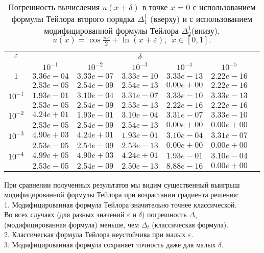 \documentclass[10pt,twoside]{uz_kgu}
\begin{document}
\begin{table} [!htb]
		\caption {Погрешность вычисления $u(x+ \delta)$ в точке $x=0$ с использованием формулы Тейлора второго порядка $\Delta_1^1$ (вверху) и с использованием модифицированной формулы Тейлора $\Delta_2^1$(внизу),
		$u(x)=  \cos \frac{\pi x}{2} + \ln{(x+\varepsilon)} ,\ \    x\in [0,1].$}
	\begin{center}
		\begin{tabular}{|c|c|c|c|c|c|c}
			\cline{1-6} $\varepsilon$ & \multicolumn{5}{c|}{$\delta$} \\
			\cline{2-6} &$10^{-1}$ & $10^{-2}$ & $10^{-3}$  & $10^{-4}$& $10^{-5}$\\
			\cline{1-6}
			$1$
			&$3.36e-04$&$3.33e-07$&$3.33e-10$&$3.33e-13$& $2.22e-16$\\
			&$2.53e-05$&$2.54e-09$&$2.54e-13$&$0.00e+00$& $2.22e-16$\\
			\cline{1-6}
			$10^{-1}$
			&$1.93e-01$&$3.10e-04$&$3.31e-07$&$3.33e-10$&$3.33e-13$\\
			&$2.53e-05$&$2.54e-09$&$2.53e-13$&$2.22e-16$&$2.22e-16$\\
			\cline{1-6}
			$10^{-2}$
			&$4.24e+01$&$1.93e-01$&$3.10e-04$&$3.31e-07$&$3.33e-10$\\
			&$2.53e-05$&$2.54e-09$&$2.54e-13$&$0.00e+00$&$0.00e+00$\\
			\cline{1-6}
			$10^{-3}$
			&$4.90e+03$&$4.24e+01$&$1.93e-01$&$3.10e-04$&$3.31e-07$\\
			&$2.53e-05$&$2.54e-09$&$2.53e-13$&$0.00e+00$&$0.00e+00$\\
			\cline{1-6}
			$10^{-4}$
			&$4.99e+05$&$4.90e+03$&$4.24e+01$&$1.93e-01$&$3.10e-04$\\
			&$2.53e-05$&$2.54e-09$&$2.50e-13$&$8.88e-16$&$0.00e+00$\\
			\cline{1-6}
		\end{tabular}
	\end{center}
\end{table}


При сравнении полученных результатов мы видим существенный выигрыш модифицированной формулы Тейлора при возрастании градиента решения:\\
1. Модифицированная формула Тейлора значительно точнее классической.\\
Во всех случаях (для разных значений $\varepsilon$ и $\delta$) погрешность $\Delta_\tau$ (модифицированная формула) меньше,  чем $\Delta_t$ (классическая формула).\\
2. Классическая формула Тейлора неустойчива при малых $\varepsilon.$\\
3. Модифицированная формула сохраняет точность даже для малых $\delta$.\\
\end{document}
